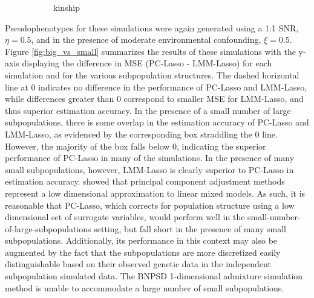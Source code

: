 \begin{figure}[H]
\begin{subfigure}{.8\textwidth}
  \caption{ kinship}
  \label{fig:vandy_groups}
\end{subfigure}
\caption{}
\label{fig:kinship}
\end{figure}

Pseudophenotypes for these simulations were again generated using a 1:1 SNR, $\eta = 0.5$, and in the presence of moderate environmental confounding, $\xi = 0.5$. Figure \ref{fig:big_vs_small} summarizes the results of these simulations with the y-axis displaying the difference in MSE (PC-Lasso - LMM-Lasso) for each simulation and for the various subpopulation structures. The dashed horizontal line at 0 indicates no difference in the performance of PC-Lasso and LMM-Lasso, while differences greater than 0 correspond to smaller MSE for LMM-Lasso, and thus superior estimation accuracy. In the presence of a small number of large subpopulations, there is some overlap in the estimation accuracy of PC-Lasso and LMM-Lasso, as evidenced by the corresponding box straddling the 0 line. However, the majority of the box falls below 0, indicating the superior performance of PC-Lasso in many of the simulations. In the presence of many small subpopulations, however, LMM-Lasso is clearly superior to PC-Lasso in estimation accuracy. \cite{hoffman2013correcting} showed that principal component adjustment methods represent a low dimensional approximation to linear mixed models. As such, it is reasonable that PC-Lasso, which corrects for population structure using a low dimensional set of surrogate variables, would perform well in the small-number-of-large-subpopulations setting, but fall short in the presence of many small subpopulations. Additionally, its performance in this context may also be augmented by the fact that the subpopulations are more discretized  easily distinguishable based on their observed genetic data in the independent subpopulation simulated data. The BNPSD 1-dimensional admixture simulation method is unable to accommodate a large number of small subpopulations.  



